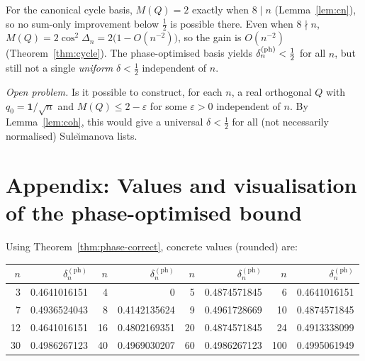 \documentclass[12pt,fleqn]{amsart}
\renewcommand{\le}{\leqslant}
\theoremstyle{remark}
\newcommand{\1}{\mathbf{1}}
\begin{document}
For the canonical cycle basis, $M(Q)=2$ exactly when $8\mid n$ (Lemma~\ref{lem:cn}), so no sum-only improvement below $\tfrac12$ is possible there. Even when $8\nmid n$, $M(Q)=2\cos^2\Delta_n=2\bigl(1-O(n^{-2})\bigr)$, so the gain is $O(n^{-2})$ (Theorem~\ref{thm:cycle}). The phase-optimised basis yields $\delta_n^{\rm (ph)}<\tfrac12$ for all $n$, but still not a single \emph{uniform} $\delta<\tfrac12$ independent of $n$.

\medskip
\noindent\emph{Open problem.} Is it possible to construct, for each $n$, a real orthogonal $Q$ with $q_0=\1/\sqrt n$ and $M(Q)\le 2-\varepsilon$ for some $\varepsilon>0$ independent of $n$. By Lemma~\ref{lem:coh}, this would give a universal $\delta<\tfrac12$ for all (not necessarily normalised) Sule\u{\i}manova lists.

\appendix

\section*{Appendix: Values and visualisation of the phase-optimised bound}

Using Theorem~\ref{thm:phase-correct}, concrete values (rounded) are:

\begin{center}
\begin{tabular}{r r @{\qquad} r r @{\qquad} r r @{\qquad} r r}
\hline
$n$ & $\delta^{\mathrm{(ph)}}_n$ & $n$ & $\delta^{\mathrm{(ph)}}_n$ & $n$ & $\delta^{\mathrm{(ph)}}_n$ & $n$ & $\delta^{\mathrm{(ph)}}_n$ \\
\hline
3  & 0.4641016151 & 4  & 0                & 5  & 0.4874571845 & 6  & 0.4641016151 \\
7  & 0.4936524043 & 8  & 0.4142135624     & 9  & 0.4961728669 & 10 & 0.4874571845 \\
12 & 0.4641016151 & 16 & 0.4802169351     & 20 & 0.4874571845 & 24 & 0.4913338099 \\
30 & 0.4986267123 & 40 & 0.4969030207     & 60 & 0.4986267123 & 100 & 0.4995061949 \\
\hline
\end{tabular}
\end{center}
\end{document}
